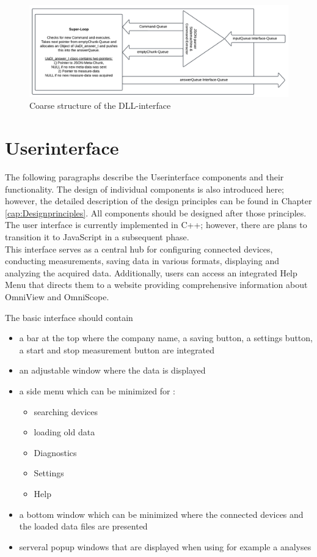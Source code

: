 \documentclass{scrreprt}
\begin{document}
\begin{figure}
    \includegraphics[width=.9\textwidth]{./assets/pictures/interface.pdf}
    \caption[]{Coarse structure of the DLL-interface}
    \label{fig:dllinterface}
\end{figure}




\section{Userinterface}

The following paragraphs describe the Userinterface components and their functionality.
The design of individual components is also introduced here; however, the detailed description of the design principles can be found in Chapter \ref{cap:Designprinciples}. All components should be designed after those principles.\\ 

The user interface is currently implemented in C++; however, there are plans to transition it to JavaScript in a subsequent phase.\\
This interface serves as a central hub for configuring connected devices, conducting measurements, saving data in various formats, displaying and analyzing the acquired data. Additionally, users can access an integrated Help Menu that directs them to a website providing comprehensive information about OmniView and OmniScope.

The basic interface should contain 

\begin{itemize}
    \item a bar at the top where the company name, a saving button, a settings button, a start and stop measurement button are integrated 
    \item an adjustable window where the data is displayed
    \item a side menu which can be minimized for : 
    \begin{itemize}
        \item searching devices 
        \item loading old data 
        \item Diagnostics
        \item Settings
        \item Help
    \end{itemize}
    \item a bottom window which can be minimized where the connected devices and the loaded data files are presented
    \item serveral popup windows that are displayed when using for example a analyses
\end{itemize}
\end{document}
